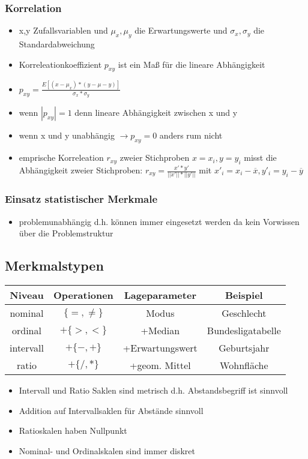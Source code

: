 \documentclass{article} %
\begin{document}
		\subsubsection{Korrelation}
		\begin{itemize}
			\item x,y Zufallsvariablen und $\mu_x,\mu_y$ die Erwartungswerte und $\sigma_x,\sigma_y$ die Standardabweichung
			\item Korreleationkoeffizient $p_{xy}$ ist ein Maß für die lineare Abhängigkeit
			\item $p_{xy} = \frac{E[(x-\mu_x)*(y-\mu-y)]}{\sigma_x*\sigma_y}$
			\item wenn $|p_{xy}| = 1$ denn lineare Abhängigkeit zwischen x und y
			\item wenn x und y unabhängig $\rightarrow p_{xy} = 0$ anders rum nicht
			\item emprische Korreleation $r_{xy}$ zweier Stichproben $x=x_i,y=y_i$ misst die Abhängigkeit zweier Stichproben: $r_{xy} = \frac{x'*y'}{||x'||*||y'||}$ mit $x'_i = x_i-\overline{x},y'_i=y_i-\overline{y}$
		\end{itemize}
		\subsubsection{Einsatz statistischer Merkmale}
		\begin{itemize}
			\item problemunabhängig d.h. können immer eingesetzt werden da kein Vorwissen über die Problemstruktur 
		\end{itemize}
	\subsection{Merkmalstypen}
		\begin{center}
			\begin{tabular}{|c|c|c|c|}
				\hline Niveau & Operationen & Lageparameter & Beispiel \\ 
				\hline nominal & $\{=,\neq\}$ & Modus &  Geschlecht\\ 
				\hline ordinal & $+\{>,<\}$ & +Median  & Bundesligatabelle \\ 
				\hline intervall & $+\{-,+\}$ & +Erwartungswert &  Geburtsjahr\\ 
				\hline ratio & $+\{/,*\}$ & +geom. Mittel & Wohnfläche \\ 
				\hline 
			\end{tabular} 
		\end{center}
		\begin{itemize}
			\item Intervall und Ratio Saklen sind metrisch d.h. Abstandsbegriff ist sinnvoll
			\item Addition auf Intervallsaklen für Abstände sinnvoll
			\item Ratioskalen haben Nullpunkt
			\item Nominal- und Ordinalskalen sind immer diskret
		\end{itemize}
\end{document}
